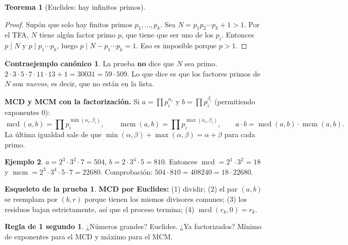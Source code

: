 \documentclass[11pt,a4paper]{article}
\newtheorem{teorema}{Teorema}[section]
\theoremstyle{definition}
\newtheorem{ejemplo}[teorema]{Ejemplo}
\newcommand{\mcd}{\operatorname{mcd}}
\newcommand{\mcm}{\operatorname{mcm}}
\theoremstyle{notait}
\theoremstyle{nota}
\newtheorem*{esqueleto}{Esqueleto de la prueba}
\newtheorem*{contra}{Contraejemplo canónico}
\newtheorem*{regla}{Regla de 1 segundo}
\begin{document}
\begin{teorema}[Euclides: hay infinitos primos]
\end{teorema}
\begin{proof}
Supón que solo hay finitos primos $p_1,\dots,p_k$. Sea $N=p_1p_2\cdots p_k+1>1$. Por el TFA, $N$ tiene algún factor primo $p$, que tiene que ser uno de los $p_i$. Entonces $p\mid N$ y $p\mid p_1\cdots p_k$, luego $p\mid N-p_1\cdots p_k=1$. Eso es imposible porque $p>1$.
\end{proof}

\begin{contra}
La prueba \textbf{no} dice que $N$ sea primo. $2\cdot3\cdot5\cdot7\cdot11\cdot13+1=30031=59\cdot 509$. Lo que dice es que los factores primos de $N$ son \emph{nuevos}, es decir, que no están en la lista.
\end{contra}

\textbf{MCD y MCM con la factorización.} Si $a=\prod p_i^{\alpha_i}$ y $b=\prod p_i^{\beta_i}$ (permitiendo exponentes $0$):
\[
\mcd(a,b)=\prod p_i^{\min(\alpha_i,\beta_i)},\qquad \mcm(a,b)=\prod p_i^{\max(\alpha_i,\beta_i)},\qquad a\cdot b=\mcd(a,b)\cdot\mcm(a,b).
\]
La última igualdad sale de que $\min(\alpha,\beta)+\max(\alpha,\beta)=\alpha+\beta$ para cada primo.

\begin{ejemplo}
$a=2^3\cdot3^2\cdot7=504$, $b=2\cdot3^4\cdot5=810$. Entonces $\mcd=2^1\cdot3^2=18$ y $\mcm=2^3\cdot3^4\cdot5\cdot7=22680$. Comprobación: $504\cdot810=408240=18\cdot22680$.
\end{ejemplo}

\begin{esqueleto}
\textbf{MCD por Euclides:} (1) dividir; (2) el par $(a,b)$ se reemplaza por $(b,r)$ porque tienen los mismos divisores comunes; (3) los residuos bajan estrictamente, así que el proceso termina; (4) $\mcd(r_k,0)=r_k$.
\end{esqueleto}

\begin{regla}
¿Números grandes? Euclides. ¿Ya factorizados? Mínimo de exponentes para el MCD y máximo para el MCM.
\end{regla}
\end{document}
